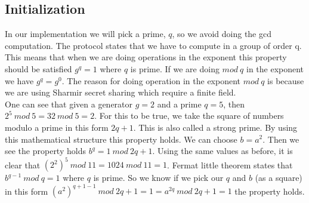 \subsection{Initialization} \label{sec:protocol_details_initialization}
\noindent
In our implementation we will pick a prime, \begin{math}q\end{math}, so we avoid doing the gcd computation. The protocol states that we have to compute in a group of order q. This means that when we are doing operations in the exponent this property should be satisfied \begin{math}g^q=1\end{math} where \begin{math}q\end{math} is prime. If we are doing \begin{math}mod \ q \end{math} in the exponent we have \begin{math}g^q=g^0\end{math}. The reason for doing operation in the exponent \begin{math}mod \ q\end{math} is because we are using Sharmir secret sharing which require a finite field.\\

\noindent
One can see that given a generator $g=2 $ and a prime $q=5$, then \begin{math}2^5 \ mod \ 5 = 32 \ mod \ 5 = 2\end{math}. For this to be true, we take the square of numbers modulo a prime in this form \begin{math}2q+1\end{math}. This is also called a strong prime. By using this mathematical structure this property holds. We can choose \begin{math}b=a^2\end{math}. Then we see the property holds \begin{math}b^{q} = 1 \ mod \ 2q+1\end{math}. Using the same values as before, it is clear that \begin{math}(2^2)^5 \ mod \ 11 = 1024 \ mod \ 11 = 1\end{math}. Fermat little theorem states that \begin{math}b^{q-1} \ mod \ q = 1\end{math} where \begin{math}q\end{math} is prime. So we know if we pick our \begin{math}q\end{math} and \begin{math}b\end{math} (as a square)  in this form \begin{math}(a^{2})^{q+1-1} \ mod \ 2q+1 =1 =  a^{2q} \ mod \ 2q+1 =1\end{math} the property holds.\\

